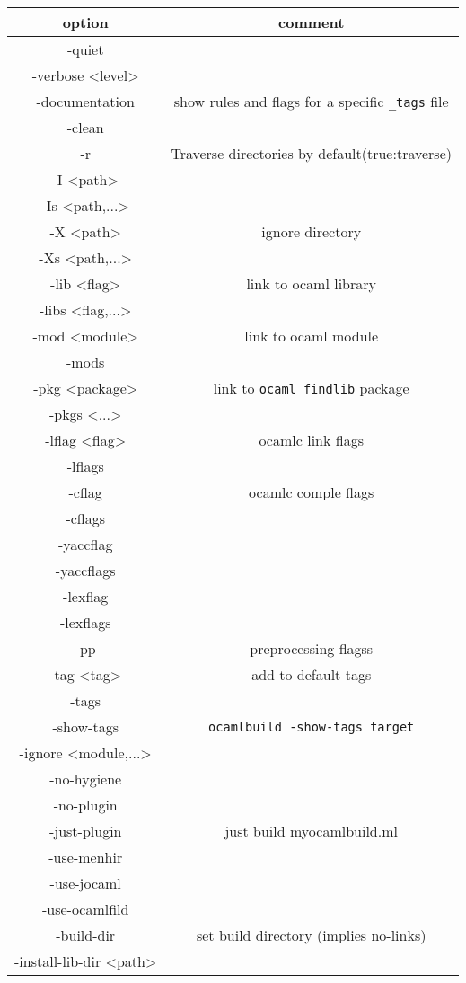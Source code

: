 \begin{spacing}{0.5}\small
\begin{tabular}{|c|c|}
\hline
option & comment \\
\hline
-quiet & \\
-verbose <level> & \\
-documentation & show rules and flags for a specific \verb|_tags| file
\\
-clean & \\
-r & Traverse directories by default(true:traverse) \\
-I <path> & \\
-Is <path,...> & \\
-X <path> & ignore directory \\
-Xs <path,...> & \\
-lib <flag> & link to ocaml library \\
-libs <flag,...> & \\
-mod <module> & link to ocaml module \\
-mods & \\
-pkg <package> & link to \verb|ocaml findlib| package \\
-pkgs <...> & \\
-lflag  <flag> & ocamlc link flags \\
-lflags & \\
-cflag & ocamlc comple flags \\
-cflags & \\
-yaccflag & \\
-yaccflags & \\
-lexflag & \\
-lexflags & \\
-pp & preprocessing flagss\\
-tag <tag> & add to default tags \\
-tags & \\
-show-tags & \verb|ocamlbuild -show-tags target| \\
-ignore <module,...> & \\
-no-hygiene & \\
-no-plugin & \\
-just-plugin & just build myocamlbuild.ml \\
-use-menhir & \\
-use-jocaml & \\
-use-ocamlfild & \\
-build-dir & set build directory (implies no-links)\\
-install-lib-dir <path> & \\

\end{tabular}
\end{spacing}
